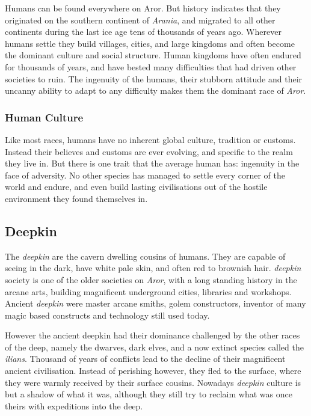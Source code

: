 Humans can be found everywhere on Aror. But history indicates that they
originated on the southern continent of \emph{Arania}, and migrated to all
other continents during the last ice age tens of thousands of years
ago. Wherever humans settle they build villages, cities, and large kingdoms
and often become the dominant culture and social structure. Human kingdoms
have often endured for thousands of years, and have bested many difficulties
that had driven other societies to ruin. The ingenuity of the humans, their
stubborn attitude and their uncanny ability to adapt to any difficulty makes
them the dominant race of \emph{Aror}.

\subsubsection*{Human Culture}

Like most races, humans have no inherent global culture, tradition or customs.
Instead their believes and customs are ever evolving, and specific to the
realm they live in. But there is one trait that the average human has: ingenuity
in the face of adversity. No other species has managed to settle every corner
of the world and endure, and even build lasting civilisations out of the
hostile environment they found themselves in.

\subsection*{Deepkin}



The \emph{deepkin} are the cavern dwelling cousins of humans. They are capable
of seeing in the dark, have white pale skin, and often red to brownish hair.
\emph{deepkin} society is one of the older societies on \emph{Aror}, with a
long standing history in the arcane arts, building magnificent underground
cities, libraries and workshops. Ancient \emph{deepkin} were master arcane
smiths, golem constructors, inventor of many magic based constructs and
technology still used today.

However the ancient deepkin had their dominance challenged by the other races
of the deep, namely the dwarves, dark elves, and a now extinct species called
the \emph{ilians}. Thousand of years of conflicts lead to the decline of their
magnificent ancient civilisation. Instead of perishing however, they fled to
the surface, where they were warmly received by their surface cousins. Nowadays
\emph{deepkin} culture is but a shadow of what it was, although they still try
to reclaim what was once theirs with expeditions into the deep.

